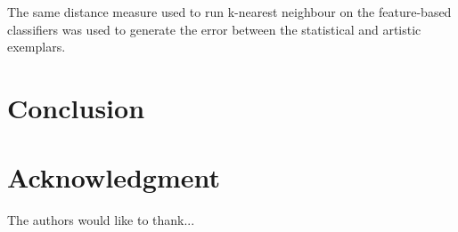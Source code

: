 \documentclass[conference,a4paper]{IEEEtran}
\begin{document}
The same distance measure used to run k-nearest neighbour on the feature-based classifiers was
used to generate the error between the statistical and artistic exemplars.



\section{Conclusion}






\section*{Acknowledgment}


The authors would like to thank...










\end{document}

